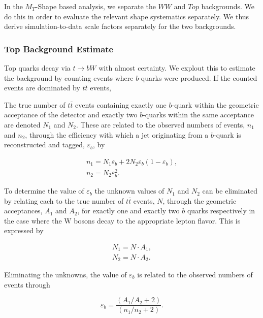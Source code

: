 
In the $M_T$-Shape based analysis, we separate the $WW$ and $Top$ backgrounds.
We do this in order to evaluate the relevant shape systematics separately.
We thus derive simulation-to-data scale factors separately for the two backgrounds.

\subsubsection{Top Background Estimate}

Top quarks decay via $t\rightarrow bW$ with almost certainty.  
We explout this to estimate the background by counting events where $b$-quarks were produced. 
If the counted events are dominated by $t\bar{t}$ events, 

The true number of $t\bar{t}$ events containing exactly one $b$-quark within the geometric acceptance 
of the detector and exactly two $b$-quarks within the same acceptance are denoted $N_{1}$ and $N_{2}$.  
These are related to the observed numbers of events, $n_{1}$ and $n_{2}$, 
through the efficiency with which a jet originating from a $b$-quark 
is reconstructed and tagged, $\varepsilon_{b}$, by 

\begin{eqnarray}
n_{1} = N_{1}\varepsilon_{b} + 2N_{2}\varepsilon_{b}(1-\varepsilon_{b}) \label{eqn:analysis_bTagEff1_n1},\\
n_{2} = N_{2}\varepsilon_{b}^{2} \label{eqn:analysis_bTagEff1_n2}.
\end{eqnarray}

To determine the value of $\varepsilon_{b}$ the unknown values of $N_{1}$ and $N_{2}$ 
can be eliminated by relating each to the true number of $t\bar{t}$ events, $N$, 
through the geometric acceptances, $A_1$ and $A_2$, for exactly one and exactly two $b$ quarks 
respectively in the case where the W bosons decay to the appropriate lepton flavor. 
This is expressed by

\begin{eqnarray}
N_{1} = N\cdot A_{1}, \\
N_{2} = N\cdot A_{2}.
\end{eqnarray}

Eliminating the unknowns, the value of $\varepsilon_{b}$ is related to the observed numbers of events through 

\begin{equation}
\label{eqn:analysis_bTagEff}
\varepsilon_{b} = \frac{(A_{1}/A_{2} + 2)}{(n_{1}/n_{2}+ 2)}.
\end{equation}

